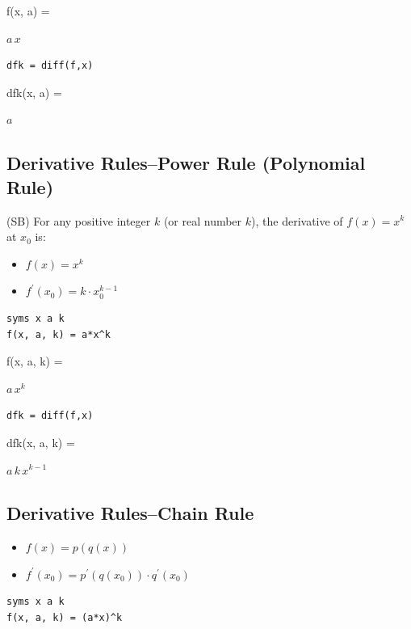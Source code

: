 \documentclass[
]{book}
\begin{document}
f(x, a) =

\(\displaystyle a\,x\)

\begin{verbatim}
dfk = diff(f,x)
\end{verbatim}

dfk(x, a) =

\(\displaystyle a\)

\hypertarget{derivative-rulespower-rule-polynomial-rule}{%
\subsection{Derivative Rules--Power Rule (Polynomial Rule)}\label{derivative-rulespower-rule-polynomial-rule}}

(SB) For any positive integer \(k\) (or real number \(k\)), the derivative
of \(f(x)=x^k\) at \(x_0\) is:

\begin{itemize}
\item
  \(\displaystyle f(x)=x^k\)
\item
  \(\displaystyle f^{\prime } (x_0 )=k\cdot x_0^{k-1}\)
\end{itemize}

\begin{verbatim}
syms x a k
f(x, a, k) = a*x^k
\end{verbatim}

f(x, a, k) =

\(\displaystyle a\,x^k\)

\begin{verbatim}
dfk = diff(f,x)
\end{verbatim}

dfk(x, a, k) =

\(\displaystyle a\,k\,x^{k-1}\)

\hypertarget{derivative-ruleschain-rule}{%
\subsection{Derivative Rules--Chain Rule}\label{derivative-ruleschain-rule}}

\begin{itemize}
\item
  \(\displaystyle f(x)=p(q(x))\)
\item
  \(\displaystyle f^{\prime } (x_0 )=p^{\prime } (q(x_0 ))\cdot q^{\prime } (x_0 )\)
\end{itemize}

\begin{verbatim}
syms x a k
f(x, a, k) = (a*x)^k
\end{verbatim}
\end{document}

